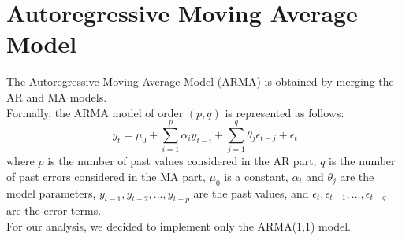 \section{Autoregressive Moving Average Model}
\label{sec:ARMA}
The Autoregressive Moving Average Model (ARMA) is obtained by merging the AR and MA models. \\
Formally, the ARMA model of order $(p, q)$ is represented as follows:
\begin{equation}
    \label{eq:ARMA}
    y_{t} = \mu_{0} + \sum^{p}_{i=1}\alpha_{i} y_{t-i} + \sum^{q}_{j=1}\theta_{j} \epsilon_{t-j} + \epsilon_t 
\end{equation}
where $p$ is the number of past values considered in the AR part, $q$ is the number of past errors considered in the MA part, $\mu_{0}$ is a constant, $\alpha_{i}$ and $\theta_{j}$ are the model parameters, $y_{t-1}, y_{t-2}, ..., y_{t-p}$ are the past values, and $\epsilon_{t}, \epsilon_{t-1}, ..., \epsilon_{t-q}$ are the error terms. \\
For our analysis, we decided to implement only the ARMA(1,1) model.

